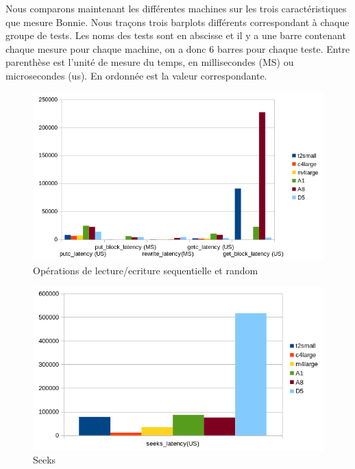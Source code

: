 \documentclass[11pt]{article}
\begin{document}
	Nous comparons maintenant les différentes machines sur les trois 
	caractéristiques que mesure Bonnie. Nous traçons trois barplots
	différents correspondant à chaque groupe de tests.
	Les noms des tests sont en abscisse et il y a une barre contenant
	chaque mesure pour chaque machine, on a donc 6 barres pour chaque 
	teste. Entre parenthèse est l'unité de mesure du temps, en 
	millisecondes (MS) ou microsecondes (us). En ordonnée est la valeur
	correspondante. \\
	\begin{figure}[htbp]
	\begin{center}
	\includegraphics[scale=0.9]{images/readwrite.png} 
	\caption{Opérations de lecture/ecriture sequentielle et random}
	\label{fig:fig0}
	\end{center}
	\end{figure}
	\begin{figure}[htbp]
	\begin{center}
	\includegraphics[scale=0.9]{images/seek.png} 
	\caption{Seeks}
	\label{fig:fig0}
	\end{center}
	\end{figure}
\end{document}
